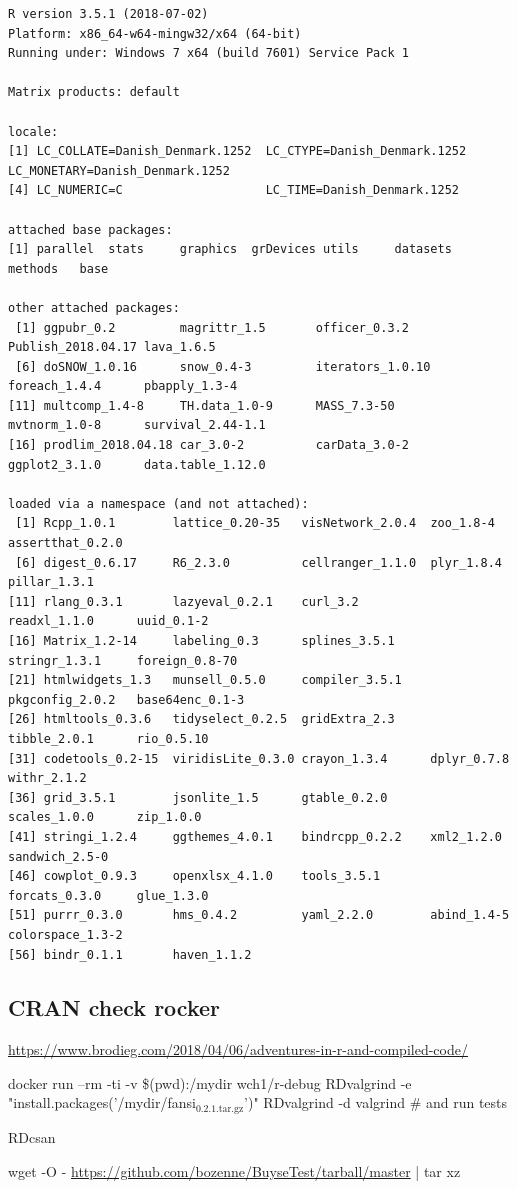 \documentclass{article}
\begin{document}
\begin{verbatim}
R version 3.5.1 (2018-07-02)
Platform: x86_64-w64-mingw32/x64 (64-bit)
Running under: Windows 7 x64 (build 7601) Service Pack 1

Matrix products: default

locale:
[1] LC_COLLATE=Danish_Denmark.1252  LC_CTYPE=Danish_Denmark.1252    LC_MONETARY=Danish_Denmark.1252
[4] LC_NUMERIC=C                    LC_TIME=Danish_Denmark.1252    

attached base packages:
[1] parallel  stats     graphics  grDevices utils     datasets  methods   base     

other attached packages:
 [1] ggpubr_0.2         magrittr_1.5       officer_0.3.2      Publish_2018.04.17 lava_1.6.5        
 [6] doSNOW_1.0.16      snow_0.4-3         iterators_1.0.10   foreach_1.4.4      pbapply_1.3-4     
[11] multcomp_1.4-8     TH.data_1.0-9      MASS_7.3-50        mvtnorm_1.0-8      survival_2.44-1.1 
[16] prodlim_2018.04.18 car_3.0-2          carData_3.0-2      ggplot2_3.1.0      data.table_1.12.0 

loaded via a namespace (and not attached):
 [1] Rcpp_1.0.1        lattice_0.20-35   visNetwork_2.0.4  zoo_1.8-4         assertthat_0.2.0 
 [6] digest_0.6.17     R6_2.3.0          cellranger_1.1.0  plyr_1.8.4        pillar_1.3.1     
[11] rlang_0.3.1       lazyeval_0.2.1    curl_3.2          readxl_1.1.0      uuid_0.1-2       
[16] Matrix_1.2-14     labeling_0.3      splines_3.5.1     stringr_1.3.1     foreign_0.8-70   
[21] htmlwidgets_1.3   munsell_0.5.0     compiler_3.5.1    pkgconfig_2.0.2   base64enc_0.1-3  
[26] htmltools_0.3.6   tidyselect_0.2.5  gridExtra_2.3     tibble_2.0.1      rio_0.5.10       
[31] codetools_0.2-15  viridisLite_0.3.0 crayon_1.3.4      dplyr_0.7.8       withr_2.1.2      
[36] grid_3.5.1        jsonlite_1.5      gtable_0.2.0      scales_1.0.0      zip_1.0.0        
[41] stringi_1.2.4     ggthemes_4.0.1    bindrcpp_0.2.2    xml2_1.2.0        sandwich_2.5-0   
[46] cowplot_0.9.3     openxlsx_4.1.0    tools_3.5.1       forcats_0.3.0     glue_1.3.0       
[51] purrr_0.3.0       hms_0.4.2         yaml_2.2.0        abind_1.4-5       colorspace_1.3-2 
[56] bindr_0.1.1       haven_1.1.2
\end{verbatim}

\subsection{CRAN check rocker}
\label{sec:org229f8cf}
\url{https://www.brodieg.com/2018/04/06/adventures-in-r-and-compiled-code/}

docker run --rm -ti -v \$(pwd):/mydir wch1/r-debug
RDvalgrind -e "install.packages('/mydir/fansi\(_{\text{0.2.1.tar.gz}}\)')"
RDvalgrind -d valgrind  \# and run tests

RDcsan

wget -O - \url{https://github.com/bozenne/BuyseTest/tarball/master} | tar xz
\end{document}
